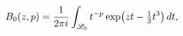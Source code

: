 \[\mathop{B_{0}\/}\nolimits\!\left(z,p\right)=\frac{1}{2\pi i}\int_{\mathscr{L}_%
{0}}t^{-p}\mathop{\exp\/}\nolimits\!\left(zt-\tfrac{1}{3}t^{3}\right)dt,\]